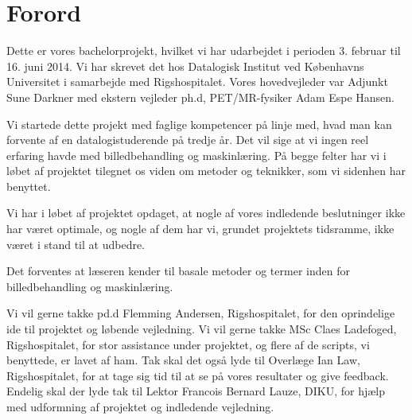 \section{Forord}

Dette er vores bachelorprojekt, hvilket vi har udarbejdet i perioden 3.
februar til 16. juni 2014. Vi har skrevet det hos Datalogisk Institut
ved Københavns Universitet i samarbejde med Rigshospitalet. Vores
hovedvejleder var Adjunkt Sune Darkner med ekstern vejleder ph.d,
PET/MR-fysiker Adam Espe Hansen.

Vi startede dette projekt med faglige kompetencer på linje med, hvad
man kan forvente af en datalogistuderende på tredje år. Det vil sige at vi
ingen reel erfaring havde med billedbehandling og maskinlæring. På begge
felter har vi i løbet af projektet tilegnet os viden om metoder og
teknikker, som vi sidenhen har benyttet.

Vi har i løbet af projektet opdaget, at nogle af vores indledende
beslutninger ikke har været optimale, og nogle af dem har vi, grundet
projektets tidsramme, ikke været i stand til at udbedre.

Det forventes at læseren kender til basale metoder og termer inden for
billedbehandling og maskinlæring.

Vi vil gerne takke pd.d Flemming Andersen, Rigshospitalet, for den
oprindelige ide til projektet og løbende vejledning. Vi vil gerne
takke MSc Claes Ladefoged, Rigshospitalet, for stor assistance under
projektet, og flere af de scripts, vi benyttede, er lavet af ham. Tak skal
det også lyde til Overlæge Ian Law, Rigshospitalet, for at tage sig tid
til at se på vores resultater og give feedback. Endelig skal der lyde
tak til Lektor Francois Bernard Lauze, DIKU, for hjælp med udformning af
projektet og indledende vejledning.


